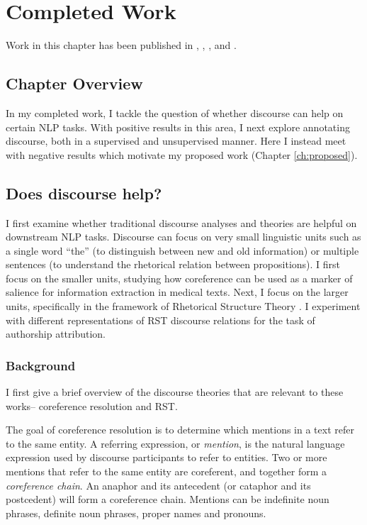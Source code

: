 \chapter{Completed Work}
\label{ch:completed}
Work in this chapter has been published in , , , and .

\section{Chapter Overview}
In my completed work, I tackle the question of whether discourse can help on certain NLP tasks. With positive results in this area, I next explore annotating discourse, both in a supervised and unsupervised manner. Here I instead meet with negative results which motivate my proposed work (Chapter \ref{ch:proposed}).

\section{Does discourse help?}
I first examine whether traditional discourse analyses and theories are helpful on downstream NLP tasks. Discourse can focus on very small linguistic units such as a single word ``the'' (to distinguish between new and old information) or multiple sentences (to understand the rhetorical relation between propositions). I first focus on the smaller units, studying how coreference can be used as a marker of salience for information extraction in medical texts. Next, I focus on the larger units, specifically in the framework of Rhetorical Structure Theory \citep[RST;][]{Mann:1988}. I experiment with different representations of RST discourse relations for the task of authorship attribution.

\subsection{Background}
I first give a brief overview of the discourse theories that are relevant to these works-- coreference resolution and RST. 

The goal of coreference resolution is to determine which mentions in a text refer to the same entity. A referring expression, or \textit{mention}, is the natural language expression used by discourse participants to refer to entities. Two or more mentions that refer to the same entity are coreferent, and together form a \textit{coreference chain}. An anaphor and its antecedent (or cataphor and its postcedent) will form a coreference chain. Mentions can be indefinite noun phrases, definite noun phrases, proper names and pronouns.

